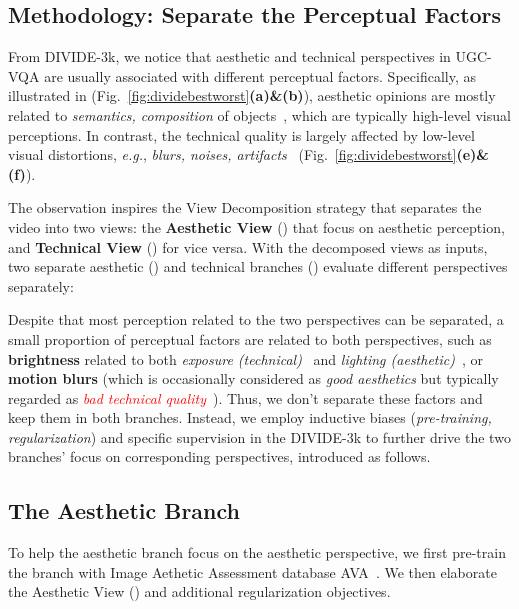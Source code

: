 \documentclass[10pt,twocolumn,letterpaper]{article}
\newcommand{\blue}[1]{\textbf{\textcolor{mblue}{#1}}}
\newcommand{\rblue}[1]{{\textcolor{mblue}{#1}}}
\newcommand{\red}[1]{\textcolor{red}{#1}}
\newcommand{\green}[1]{\textcolor{mgreen}{#1}}
\begin{document}
\subsection{Methodology: Separate the Perceptual Factors}
\label{sec:viewdecomposition}

From DIVIDE-3k, we notice that aesthetic and technical perspectives in UGC-VQA are usually associated with different perceptual factors. Specifically, as illustrated in (Fig.~\ref{fig:dividebestworst}\blue{\textbf{(a)\&(b)}}), aesthetic opinions are mostly related to \textit{semantics, composition} of objects~\cite{objiaa,cadb,distilliaa}, which are typically high-level visual perceptions. In contrast, the technical quality is largely affected by low-level visual distortions, \textit{e.g.}, \textit{blurs, noises, artifacts}~\cite{dbcnn,fastvqa,discovqa,pvq,paq2piq} (Fig.~\ref{fig:dividebestworst}\green{\textbf{(e)\&(f)}}). 

The observation inspires the View Decomposition strategy that separates the video into two views: the \textbf{Aesthetic View} () that focus on aesthetic perception, and \textbf{Technical View} () for vice versa. With the decomposed views as inputs, two separate aesthetic () and technical branches () evaluate different perspectives separately:



Despite that most perception related to the two perspectives can be separated, a small proportion of perceptual factors are related to both perspectives, such as \textbf{brightness} related to both \green{\textit{exposure (technical)}}~\cite{qualcomm} and \rblue{\textit{lighting (aesthetic)}}~\cite{piaadataset}, or \textbf{motion blurs} (which is occasionally considered as \rblue{\textit{good aesthetics}} but typically regarded as \red{\textit{bad technical quality}}~\cite{atqa}). Thus, we don't separate these factors and keep them in both branches. Instead, we employ inductive biases (\textit{pre-training, regularization}) and specific supervision in the DIVIDE-3k to further drive the two branches' focus on corresponding perspectives, introduced as follows.




\subsection{The Aesthetic Branch}
\label{sec:aesbranch}


To help the aesthetic branch focus on the aesthetic perspective, we first pre-train the branch with Image Aethetic Assessment database AVA~\cite{avaiaa}. We then elaborate the Aesthetic View () and additional regularization objectives.
\end{document}
